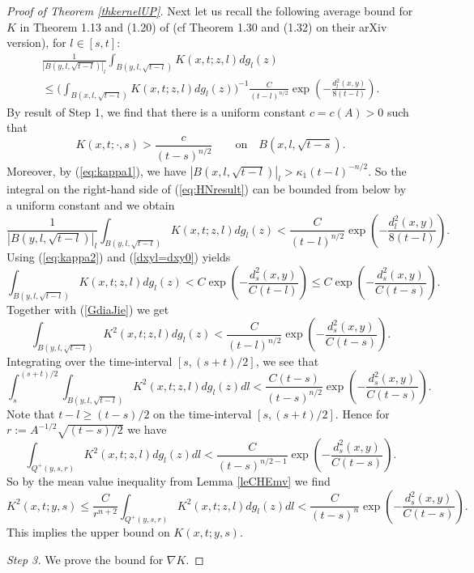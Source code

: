 \documentclass[11pt]{amsart}
\numberwithin{equation}{section}
\numberwithin{equation}{section}
\begin{document}
\begin{proof}[Proof of Theorem \ref{thkernelUP}]
Next let us recall the following average bound for $K$ in Theorem 1.13 and (1.20) of \cite{HN:1} (cf Theorem 1.30 and (1.32) on their arXiv version), for $l \in [s,t]$:
\begin{multline} \label{eq:HNresult}
\frac{1}{ |B(y,  l, \sqrt{t-l})|_{l}} \int_{B(y, l, \sqrt{t-l})} K (x, t; z, l) dg_l (z) \\
\le \bigg( \int_{B(x,l, \sqrt{t-l})} K(x,t; z, l ) dg_l (z) \bigg)^{-1} \frac{C}{(t-l)^{n/2}} \exp \left( - \frac{d^2_{l} ( x, y)}{8(t-l)}  \right).
\end{multline}
By result of Step 1, we find that there is a uniform constant $c = c(A) > 0$ such that
\[ K(x,t; \cdot, s) > \frac{c}{(t-s)^{n/2}} \qquad \text{on} \quad B(x, l, \sqrt{t-s}). \]
Moreover, by (\ref{eq:kappa1}), we have $|B(x,l, \sqrt{t-l}) |_l > \kappa_1 (t-l)^{-n/2}$.
So the integral on the right-hand side of (\ref{eq:HNresult}) can be bounded from below by a uniform constant and we obtain
\[ \frac{1}{ |B(y,  l, \sqrt{t-l})|_{l}} \int_{B(y, l, \sqrt{t-l})} K (x, t; z, l) dg_l (z) <  \frac{C}{(t-l)^{n/2}} \exp \left( - \frac{d^2_{l} ( x, y)}{8(t-l)}  \right). \]
Using (\ref{eq:kappa2}) and (\ref{dxyl=dxy0}) yields
\[  \int_{B(y, l, \sqrt{t-l})} K (x, t; z, l) dg_l (z) <  C \exp \left( {- \frac{d^2_{s} ( x, y)}{C (t-l)} } \right) \leq C \exp \left( {- \frac{d^2_{s} ( x, y)}{C (t-s)}}  \right). \]
Together with (\ref{GdiaJie}) we get
\[ \int_{B(y, l, \sqrt{t-l})} K^2(x, t; z, l) dg_l (z) < \frac{C}{(t-l)^{n/2}} \exp \left({ - \frac{d^2_s (x, y)}{C(t-s)}}
 \right). \] 
Integrating over the time-interval $[s, (s+ t)/2]$, we see that
\[
\int^{(s+t)/2}_s \int_{B(y, l, \sqrt{t-l})} K^2(x, t; z, l) dg_l (z) dl <
\frac{C (t-s)}{(t-s)^{n/2}} \exp \left( { -  \frac{d^2_s (x, y)}{C(t-s)} } \right).
\] 
Note that $t-l \ge (t-s)/2$ on the time-interval $[s, (s+t)/2]$. 
Hence for $r := A^{-1/2} \sqrt{(t-s)/2}$ we have
\[
 \int_{Q^+ (y, s, r)} K^2(x, t; z, l) dg_l(z) dl <
\frac{C}{(t-s)^{n/2-1}} \exp \left( {- \frac{d^2_s (x, y)}{C(t-s)} } \right).
\]
So by the mean value inequality from Lemma \ref{leCHEmv} we find
\[ K^2 (x,t; y, s) \leq \frac{C}{r^{n+2}} \int_{Q^+ (y, s, r)} K^2(x, t; z, l) dg_l(z) dl < \frac{C}{(t-s)^{n}} \exp \left( {- \frac{d^2_s (x, y)}{C(t-s)} } \right). \]
This implies the upper bound on $K(x,t; y,s)$.

\textit{Step 3.} 
We prove the  bound for $\nabla K$.


\end{proof}
\end{document}
